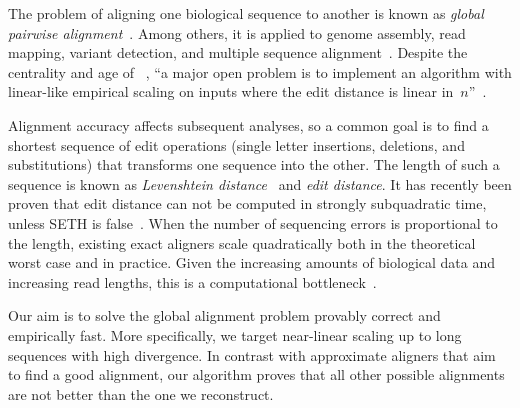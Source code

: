 The problem of aligning one biological sequence to another is known as
\emph{global pairwise alignment}~\citep{navarro2001guided}. Among others, it is
applied to genome assembly, read mapping, variant detection, and multiple
sequence alignment~\citep{prjibelski2018sequence}. Despite the centrality and
age of \pa~\citep{needleman1970general}, ``a major open problem is to implement
an algorithm with linear-like empirical scaling on inputs where the edit
distance is linear in~$n$''~\citep{medvedev2022theoretical}.

Alignment accuracy affects subsequent analyses, so a common goal is to find a
shortest sequence of edit operations (single letter insertions, deletions, and
substitutions) that transforms one sequence into the other. The length of such a
sequence is known as \emph{Levenshtein distance}~\citep{levenshtein1966binary}
and \emph{edit distance}. It has recently been proven that edit distance can not
be computed in strongly subquadratic time, unless SETH is
false~\citep{backurs2015edit}. When the number of sequencing errors is
proportional to the length, existing exact aligners scale quadratically both in
the theoretical worst case and in practice. Given the increasing amounts of
biological data and increasing read lengths, this is a computational
bottleneck~\citep{kucherov2019evolution}.

Our aim is to solve the global alignment problem provably correct and
empirically fast. More specifically, we target near-linear scaling up to long
sequences with high divergence. In contrast with approximate aligners that aim
to find a good alignment, our algorithm proves that all other possible
alignments are not better than the one we reconstruct.
